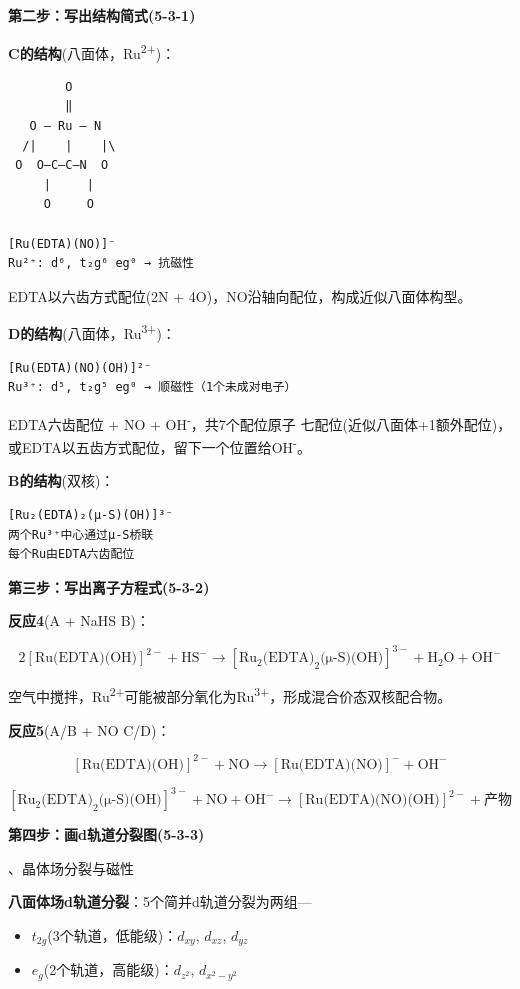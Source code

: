 \textbf{第二步：写出结构简式(5-3-1)}

\textbf{C的结构}(八面体，Ru\textsuperscript{2+})：

\begin{verbatim}
        O
        ‖
   O — Ru — N
  /|    |    |\
 O  O—C—C—N  O
     |     |
     O     O
     
[Ru(EDTA)(NO)]⁻
Ru²⁺: d⁶, t₂g⁶ eg⁰ → 抗磁性
\end{verbatim}

EDTA以六齿方式配位(2N + 4O)，NO沿轴向配位，构成近似八面体构型。

\textbf{D的结构}(八面体，Ru\textsuperscript{3+})：

\begin{verbatim}
[Ru(EDTA)(NO)(OH)]²⁻
Ru³⁺: d⁵, t₂g⁵ eg⁰ → 顺磁性（1个未成对电子）
\end{verbatim}

EDTA六齿配位 + NO + OH\textsuperscript{-}，共7个配位原子 \箭 七配位(近似八面体+1额外配位)，或EDTA以五齿方式配位，留下一个位置给OH\textsuperscript{-}。

\textbf{B的结构}(双核)：

\begin{verbatim}
[Ru₂(EDTA)₂(μ-S)(OH)]³⁻
两个Ru³⁺中心通过μ-S桥联
每个Ru由EDTA六齿配位
\end{verbatim}

\textbf{第三步：写出离子方程式(5-3-2)}

\textbf{反应4}(A + NaHS \箭 B)：

\[2[\text{Ru(EDTA)(OH)}]^{2-} + \text{HS}^{-} \rightarrow [\text{Ru}_2\text{(EDTA)}_2\text{(μ-S)(OH)}]^{3-} + \text{H}_2\text{O} + \text{OH}^{-}\]

空气中搅拌，Ru\textsuperscript{2+}可能被部分氧化为Ru\textsuperscript{3+}，形成混合价态双核配合物。

\textbf{反应5}(A/B + NO \箭 C/D)：

\[[\text{Ru(EDTA)(OH)}]^{2-} + \text{NO} \rightarrow [\text{Ru(EDTA)(NO)}]^{-} + \text{OH}^{-}\]

\[[\text{Ru}_2\text{(EDTA)}_2\text{(μ-S)(OH)}]^{3-} + \text{NO} + \text{OH}^{-} \rightarrow [\text{Ru(EDTA)(NO)(OH)}]^{2-} + \text{产物}\]

\textbf{第四步：画d轨道分裂图(5-3-3)}

、晶体场分裂与磁性

\textbf{八面体场d轨道分裂}：5个简并d轨道分裂为两组---

\begin{itemize}
\tightlist
\item
  \textbf{\(t_{2g}\)}(3个轨道，低能级)：\(d_{xy}\), \(d_{xz}\), \(d_{yz}\)
\item
  \textbf{\(e_{g}\)}(2个轨道，高能级)：\(d_{z^2}\), \(d_{x^2-y^2}\)
\end{itemize}


